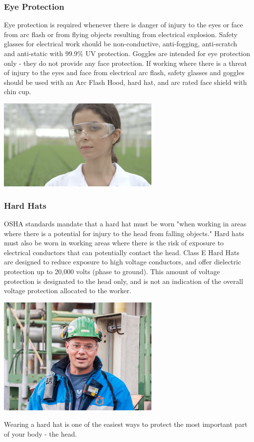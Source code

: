 \documentclass[11pt,a4paper]{article}
\begin{document}
\subsubsection*{Eye Protection}
Eye protection is required whenever there is danger of injury to the eyes or face from arc flash or from flying objects resulting from electrical explosion. Safety glasses for electrical work should be non-conductive, anti-fogging, anti-scratch and anti-static with 99.9\% UV protection. Goggles are intended for eye protection only - they do not provide any face protection. If working where there is a threat of injury to the eyes and face from electrical arc flash, safety glasses and goggles should be used with an Arc Flash Hood, hard hat, and arc rated face shield with chin cup.
\begin{center}
  \includegraphics[width=8cm]{glasses.jpg}\par
  \end{center}
\subsubsection*{Hard Hats}
OSHA standards mandate that a hard hat must be worn "when working in areas where there is a potential for injury to the head from falling objects." Hard hats must also be worn in working areas where there is the risk of exposure to electrical conductors that can potentially contact the head. Class E Hard Hats are designed to reduce exposure to high voltage conductors, and offer dielectric protection up to 20,000 volts (phase to ground). This amount of voltage protection is designated to the head only, and is not an indication of the overall voltage protection allocated to the worker.
\begin{center}
  \includegraphics[width=8cm]{hat.jpg}\par
Wearing a hard hat is one of the easiest ways to protect the most important part of your body - the head.
  \end{center}
\end{document}
